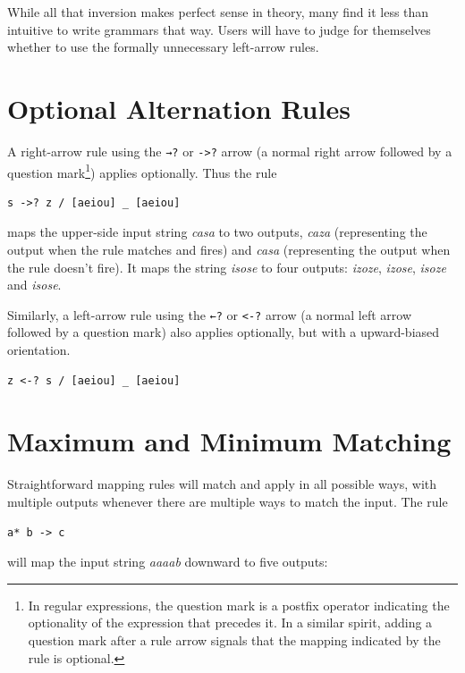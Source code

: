 \noindent 
While all that inversion makes perfect sense in theory, many find it less than intuitive to write grammars that way.
Users will have to judge for themselves whether to use
the formally unnecessary left-arrow rules.

\section{Optional Alternation Rules}

A right-arrow rule using the \texttt{→?} or \texttt{->?} arrow (a normal right arrow followed by a question
mark\footnote{In regular expressions, the question mark is a postfix operator indicating the optionality of the expression that
precedes it.  In a similar spirit, adding a question mark after a rule arrow signals that the mapping indicated by the rule is
optional.}) applies optionally.  Thus
the rule

\begin{Verbatim}
s ->? z / [aeiou] _ [aeiou]
\end{Verbatim}

\noindent
maps the upper-side input string \emph{casa} to two outputs, \emph{caza} (representing the output when
the rule matches and fires) and
\emph{casa} (representing the output when the rule doesn't fire).  It 
maps the string \emph{isose} to four outputs:
\emph{izoze}, \emph{izose}, \emph{isoze} and \emph{isose}.

Similarly, a left-arrow rule using the \texttt{←?} or \texttt{<-?} arrow (a normal left arrow followed by a question mark) also
applies optionally, but with a upward-biased orientation.

\begin{Verbatim}
z <-? s / [aeiou] _ [aeiou]
\end{Verbatim}

\section{Maximum and Minimum Matching}

Straightforward mapping rules will match and apply in all possible ways, with multiple outputs
whenever there are multiple ways to match the input.  The rule

\begin{Verbatim}
a* b -> c
\end{Verbatim}

\noindent
will map the input string \emph{aaaab} downward to five outputs:

